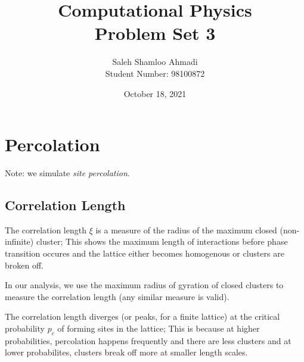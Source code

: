 \documentclass[12pt,a4paper]{article}
\title{Computational Physics\\Problem Set 3}
\author{Saleh Shamloo Ahmadi\\Student Number: 98100872}
\date{October 18, 2021}
\begin{document}
	\maketitle
	\section{Percolation}
	Note: we simulate \emph{site percolation}.
	\subsection{Correlation Length}
	The correlation length $\xi$ is a measure of the radius of the maximum closed (non-infinite) cluster;
	This shows the maximum length of interactions before phase transition occures and the lattice either becomes
	homogenous or clusters are broken off.
	
	In our analysis, we use the maximum radius of gyration of closed clusters to measure the correlation length
	(any similar measure is valid).

	The correlation length diverges (or peaks, for a finite lattice) at the critical probability $p_c$ of forming sites
	in the lattice; This is because at higher probabilities, percolation happens frequently and there are less clusters
	and at lower probabilites, clusters break off more at smaller length scales.
	
\end{document}
